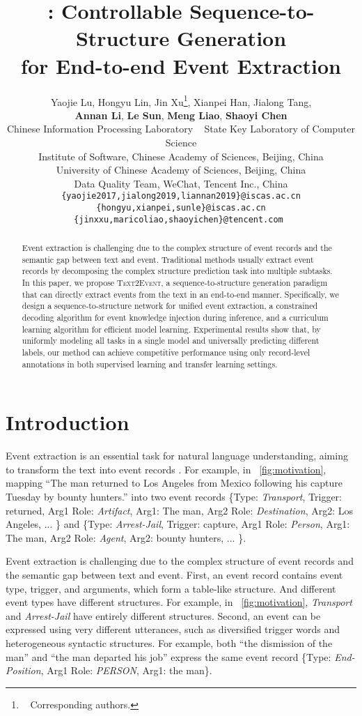 \documentclass[11pt,a4paper]{article}
\title{\modelname: Controllable Sequence-to-Structure Generation \\ for End-to-end Event Extraction}
\author{
  Yaojie Lu,
  Hongyu Lin,
  Jin Xu\thanks{~ Corresponding authors.},
  Xianpei Han\footnotemark[1],
  Jialong Tang,
  \\
  \textbf{Annan Li},
  \textbf{Le Sun},
  \textbf{Meng Liao},
  \textbf{Shaoyi Chen}
  \\
  Chinese Information Processing Laboratory ~
  State Key Laboratory of Computer Science \\
  Institute of Software, Chinese Academy of Sciences, Beijing, China\\
  University of Chinese Academy of Sciences, Beijing, China \\
  Data Quality Team, WeChat, Tencent Inc., China \\
 {\tt \{yaojie2017,jialong2019,liannan2019\}@iscas.ac.cn} \\
 {\tt \{hongyu,xianpei,sunle\}@iscas.ac.cn} \\
 {\tt \{jinxxu,maricoliao,shaoyichen\}@tencent.com }
}
\date{}
\newcommand\modelname{\textsc{Text2Event}}
\newcommand{\eventtpye}[1]{\textit{#1}}
\begin{document}
\maketitle

\begin{abstract}

Event extraction is challenging due to the complex structure of event records and the semantic gap between text and event.
Traditional methods usually extract event records by decomposing the complex structure prediction task into multiple subtasks.
In this paper, we propose \modelname, a sequence-to-structure generation paradigm that can directly extract events from the text in an end-to-end manner.
Specifically, we design a sequence-to-structure network for unified event extraction, a constrained decoding algorithm for event knowledge injection during inference, and a curriculum learning algorithm for efficient model learning.
Experimental results show that, by uniformly modeling all tasks in a single model and universally predicting different labels, our method can achieve competitive performance using only record-level annotations in both supervised learning and transfer learning settings.

\end{abstract}
 
\section{Introduction}\label{sec:introduction}

Event extraction is an essential task for natural language understanding, aiming to transform the text into event records \citep{doddington-etal-2004-automatic,ahn:2006:ARTE}.
For example, in \figurename~\ref{fig:motivation}, mapping ``The man returned to Los Angeles from Mexico following his capture Tuesday by bounty hunters.'' into two event records 
\{Type: \eventtpye{Transport}, Trigger: returned, Arg1 Role: \eventtpye{Artifact}, Arg1: The man, Arg2 Role: \eventtpye{Destination}, Arg2: Los Angeles, ... \} 
and 
\{Type: \eventtpye{Arrest-Jail}, Trigger: capture, Arg1 Role: \eventtpye{Person}, Arg1: The man, Arg2 Role: \eventtpye{Agent}, Arg2: bounty hunters, ... \}.

Event extraction is challenging due to the complex structure of event records and the semantic gap between text and event.
First, an event record contains event type, trigger, and arguments, which form a table-like structure.
And different event types have different structures.
For example, in \figurename~\ref{fig:motivation}, \eventtpye{Transport} and \eventtpye{Arrest-Jail} have entirely different structures.
Second, an event can be expressed using very different utterances, such as diversified trigger words and heterogeneous syntactic structures.
For example, both ``the dismission of the man'' and ``the man departed his job'' express the same event record \{Type: \eventtpye{End-Position}, Arg1 Role: \eventtpye{PERSON}, Arg1: the man\}.
\end{document}
